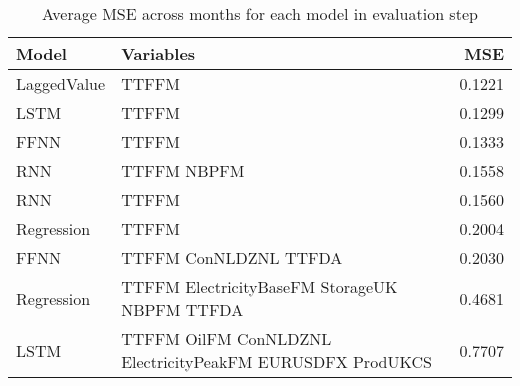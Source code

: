 \begin{table}[h!]
\centering
 \begin{adjustbox}{max width=\textwidth}
\begin{tabular}{llr}
  \hline
Model & Variables & MSE \\ 
  \hline
LaggedValue & TTFFM  & 0.1221 \\ 
  LSTM & TTFFM  & 0.1299 \\ 
  FFNN & TTFFM  & 0.1333 \\ 
  RNN & TTFFM NBPFM & 0.1558 \\ 
  RNN & TTFFM  & 0.1560 \\ 
  Regression & TTFFM  & 0.2004 \\ 
  FFNN & TTFFM ConNLDZNL TTFDA & 0.2030 \\ 
  Regression & TTFFM ElectricityBaseFM StorageUK NBPFM TTFDA & 0.4681 \\ 
  LSTM & TTFFM OilFM ConNLDZNL ElectricityPeakFM EURUSDFX ProdUKCS & 0.7707 \\ 
   \hline
 \end{tabular}
\end{adjustbox}
\caption{Average MSE across months for each model in evaluation step} 
\label{tab:level.eval.short}
\end{table}

